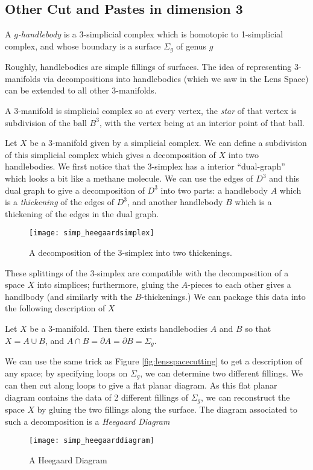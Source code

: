 \subsection{Other Cut and Pastes in dimension 3}
\begin{definition}
A \emph{$g$-handlebody} is a 3-simplicial complex which is homotopic to 1-simplicial complex, and whose boundary is a surface $\Sigma_g$ of genus $g$
\end{definition}
Roughly, handlebodies are simple fillings of surfaces. The idea of representing 3-manifolds via decompositions into handlebodies (which we saw in the Lens Space) can be extended to all other 3-manifolds. 
\begin{definition}
A 3-manifold is simplicial complex so at every vertex, the \emph{star} of that vertex is subdivision of the ball $B^3$, with the vertex being at an interior point of that ball.
\end{definition}
Let $X$ be a 3-manifold given by a simplicial complex. We can define a subdivision of this simplicial complex which gives a decomposition of $X$ into two handlebodies. We first notice that the 3-simplex has a interior ``dual-graph'' which looks a bit like a methane molecule. We can use the edges of $D^3$ and this dual graph to give a decomposition of $D^3$ into two parts: a handlebody $A$ which is a \emph{thickening} of the edges of $D^3$, and another handlebody $B$ which is a thickening of the edges in the dual graph.\\
\begin{figure}
\centering
\texttt{[image: simp\_heegaardsimplex]}
\caption{A decomposition of the $3$-simplex into two thickenings.}
\end{figure}
These splittings of the 3-simplex are compatible with the decomposition of a space $X$ into simplices; furthermore, gluing the $A$-pieces to each other gives a handlbody (and similarly with the $B$-thickenings.) We can package this data into the following description of $X$
\begin{lemma} Let $X$ be a 3-manifold. Then there exists handlebodies $A$ and $B$ so that $X=A\cup B$, and $A\cap B= \partial A=\partial B=\Sigma_g$. 
\end{lemma}
We can use the same trick as Figure \ref{fig:lensspacecutting} to get a description of any space; by specifying loops on $\Sigma_g$, we can determine two different fillings.\project \label{proj:heegaard} We can then cut along loops to give a flat planar diagram. As this flat planar diagram contains the data of 2 different fillings of $\Sigma_g$, we can reconstruct the space $X$ by gluing the two fillings along the surface. The diagram associated to such a decomposition is a \emph{Heegaard Diagram}
\begin{figure}
\centering
\texttt{[image: simp\_heegaarddiagram]}
\caption{A Heegaard Diagram}
\end{figure}


